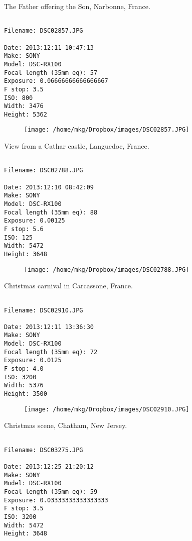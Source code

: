 \clearpage
\onecolumn
\noindent The Father offering the Son, Narbonne, France.
\noindent
\begin{lstlisting}

Filename: DSC02857.JPG

Date: 2013:12:11 10:47:13
Make: SONY
Model: DSC-RX100
Focal length (35mm eq): 57
Exposure: 0.06666666666666667
F stop: 3.5
ISO: 800
Width: 3476
Height: 5362
\end{lstlisting}
\clearpage

\begin{figure}
\texttt{[image: /home/mkg/Dropbox/images/DSC02857.JPG]}
\end{figure}
    
\clearpage
\onecolumn
\noindent View from a Cathar castle, Languedoc, France.
\noindent
\begin{lstlisting}

Filename: DSC02788.JPG

Date: 2013:12:10 08:42:09
Make: SONY
Model: DSC-RX100
Focal length (35mm eq): 88
Exposure: 0.00125
F stop: 5.6
ISO: 125
Width: 5472
Height: 3648
\end{lstlisting}
\clearpage

\begin{figure}
\texttt{[image: /home/mkg/Dropbox/images/DSC02788.JPG]}
\end{figure}
    
\clearpage
\onecolumn
\noindent Christmas carnival in Carcassone, France.
\noindent
\begin{lstlisting}

Filename: DSC02910.JPG

Date: 2013:12:11 13:36:30
Make: SONY
Model: DSC-RX100
Focal length (35mm eq): 72
Exposure: 0.0125
F stop: 4.0
ISO: 3200
Width: 5376
Height: 3500
\end{lstlisting}
\clearpage

\begin{figure}
\texttt{[image: /home/mkg/Dropbox/images/DSC02910.JPG]}
\end{figure}
    
\clearpage
\onecolumn
\noindent Christmas scene, Chatham, New Jersey.
\noindent
\begin{lstlisting}

Filename: DSC03275.JPG

Date: 2013:12:25 21:20:12
Make: SONY
Model: DSC-RX100
Focal length (35mm eq): 59
Exposure: 0.03333333333333333
F stop: 3.5
ISO: 3200
Width: 5472
Height: 3648
\end{lstlisting}
\clearpage

